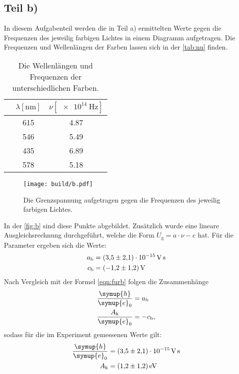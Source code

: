 \subsection{Teil b)}
In diesem Aufgabenteil werden die in Teil a) ermittelten Werte gegen die Frequenzen des jeweilig farbigen Lichtes in einem Diagramm aufgetragen. 
Die Frequenzen und Wellenlängen der Farben lassen sich in der \autoref{tab:nu} finden. 
\begin{table}
  \centering
  \caption{Die Wellenlängen und Frequenzen der unterschiedlichen Farben.}
  \label{tab:nu}
  \begin{tabular}{S[table-format=7] S[table-format=3] S[table-format=1.2]}
    \toprule
    & $\lambda [\si{\nano\metre}]$ & $\nu [\SI{e14}{\hertz}]$\\
    \midrule
        & 615 & 4.87\\
       & 546 & 5.49\\
     & 435 & 6.89\\
     & 578 & 5.18 \\
    \bottomrule
  \end{tabular}
\end{table}

\begin{figure}[H]
  \centering
  \texttt{[image: build/b.pdf]}
  \caption{Die Grenzspannung aufgetragen gegen die Frequenzen des jeweilig farbigen Lichtes.}
  \label{fig:b}
\end{figure}
\noindent
In der \autoref{fig:b} sind diese Punkte abgebildet. 
Zusätzlich wurde eine lineare Ausgleichsrechnung durchgeführt, welche die Form $U_{\text{g}} = a\cdot \nu - c$ hat.
Für die Parameter ergeben sich die Werte: 
\begin{align*}
  a_{\text{b}} &= \SI{3.5(21)e-15}{\volt\second}\\
  c_{\text{b}} &= \SI{-1.2 \pm 1.2}{\volt}
\end{align*}
Nach Vergleich mit der Formel \eqref{eqn:furb} folgen die Zusammenhänge
\begin{align*}
  \frac{\symup{h}}{\symup{e}_0} &= a_{\text{b}}\\
  \frac{A_{\text{k}}}{\symup{e}_0} &= - c_{\text{b}},
\end{align*}
sodass für die im Experiment gemessenen Werte gilt:
\begin{align*}
  \frac{\symup{h}}{\symup{e}_0} &= \SI{3.5(21)e-15}{\volt\second}\\
  A_{\text{k}} &= \SI{1.2 \pm 1.2}{\electronvolt}
\end{align*}

